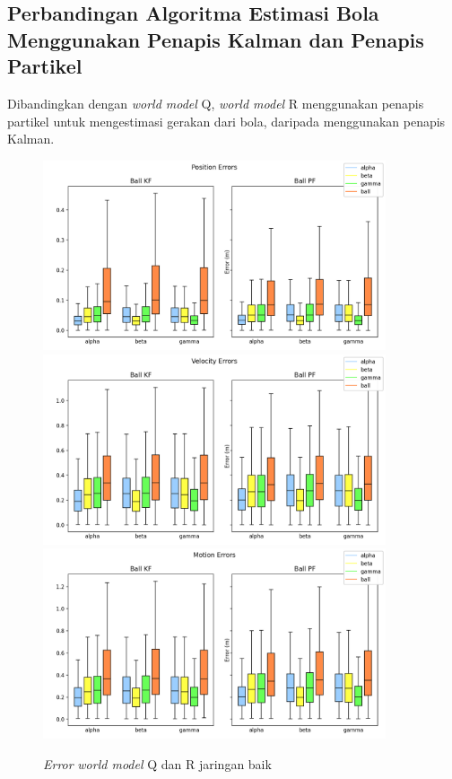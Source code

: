 \subsection{Perbandingan Algoritma Estimasi Bola Menggunakan Penapis Kalman dan Penapis Partikel}

Dibandingkan dengan \textit{world model} Q, \textit{world model} R menggunakan penapis partikel untuk mengestimasi gerakan dari bola, daripada menggunakan penapis Kalman.

\begin{figure}[p]
    \centering
    \medskip
    \includegraphics[width=0.9\textwidth]{resources/cfg1_AQ_AR_error_pos.png}
    \includegraphics[width=0.9\textwidth]{resources/cfg1_AQ_AR_error_vel.png}
    \includegraphics[width=0.9\textwidth]{resources/cfg1_AQ_AR_error_motion.png}
    \caption{\textit{Error} \textit{world model} Q dan R jaringan baik}
    \label{fig:1-q-r-error}
    \bigskip
\end{figure}

